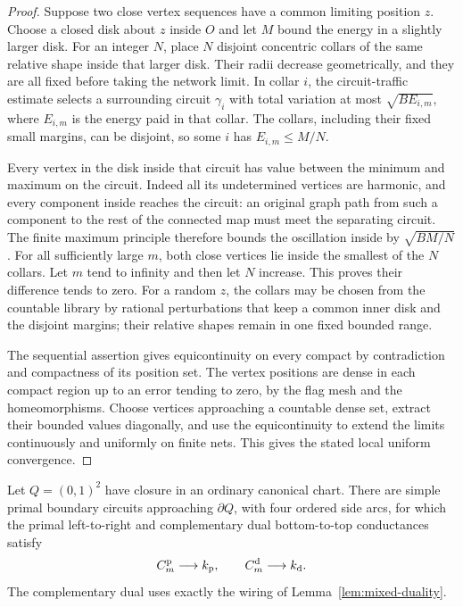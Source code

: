 \begin{proof}
Suppose two close vertex sequences have a common limiting position \(z\).
Choose a closed disk about \(z\) inside \(O\) and let \(M\) bound the energy
in a slightly larger disk.  For an integer \(N\), place \(N\) disjoint
concentric collars of the same relative shape inside that larger disk.
Their radii decrease geometrically, and they are all fixed before taking
the network limit.  In collar \(i\), the circuit-traffic estimate selects
a surrounding circuit \(\gamma_i\) with total variation at most
\(\sqrt{B E_{i,m}}\), where \(E_{i,m}\) is the energy paid in that collar.
The collars, including their fixed small margins, can be disjoint, so
some \(i\) has \(E_{i,m}\le M/N\).

Every vertex in the disk inside that circuit has value between the minimum
and maximum on the circuit.  Indeed all its undetermined vertices are
harmonic, and every component inside reaches the circuit: an original
graph path from such a component to the rest of the connected map must
meet the separating circuit.  The finite maximum principle therefore
bounds the oscillation inside by \(\sqrt{BM/N}\).
For all sufficiently large \(m\), both close vertices lie inside the
smallest of the \(N\) collars.  Let \(m\) tend to infinity and then let
\(N\) increase.  This proves their difference tends to zero.  For a
random \(z\), the collars may be chosen from the countable library by
rational perturbations that keep a common inner disk and the disjoint
margins; their relative shapes remain in one fixed bounded range.

The sequential assertion gives equicontinuity on every compact by
contradiction and compactness of its position set.  The vertex positions
are dense in each compact region up to an error tending to zero, by the
flag mesh and the homeomorphisms.  Choose vertices approaching a countable
dense set, extract their bounded values diagonally, and use the
equicontinuity to extend the limits continuously and uniformly on finite
nets.  This gives the stated local uniform convergence.
\end{proof}

\begin{lemma}\label{lem:square-conductance}
Let \(Q=(0,1)^2\) have closure in an ordinary canonical chart.  There are
simple primal boundary circuits approaching \(\partial Q\), with four
ordered side arcs, for which the primal left-to-right and complementary
dual bottom-to-top conductances satisfy
\[
                C_m^{\rm p}\longrightarrow k_{\rm p},
 \qquad        C_m^{\rm d}\longrightarrow k_{\rm d}.
\]
The complementary dual uses exactly the wiring of
Lemma~\ref{lem:mixed-duality}.
\end{lemma}

